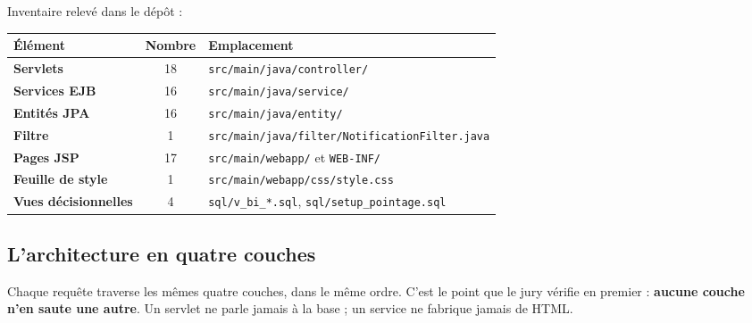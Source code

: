 Inventaire relevé dans le dépôt :

\noindent\begin{tabularx}{\textwidth}{|>{\bfseries}L{3.6cm}|c|X|}
\hline
Élément & Nombre & Emplacement\\
\hline
Servlets & 18 & \texttt{src/main/java/controller/}\\
\hline
Services EJB & 16 & \texttt{src/main/java/service/}\\
\hline
Entités JPA & 16 & \texttt{src/main/java/entity/}\\
\hline
Filtre & 1 & \texttt{src/main/java/filter/NotificationFilter.java}\\
\hline
Pages JSP & 17 & \texttt{src/main/webapp/} et \texttt{WEB-INF/}\\
\hline
Feuille de style & 1 & \texttt{src/main/webapp/css/style.css}\\
\hline
Vues décisionnelles & 4 & \texttt{sql/v\_bi\_*.sql}, \texttt{sql/setup\_pointage.sql}\\
\hline
\end{tabularx}

\subsection{L'architecture en quatre couches}

Chaque requête traverse les mêmes quatre couches, dans le même ordre. C'est le
point que le jury vérifie en premier : \textbf{aucune couche n'en saute une
autre}. Un servlet ne parle jamais à la base ; un service ne fabrique jamais de
HTML.

